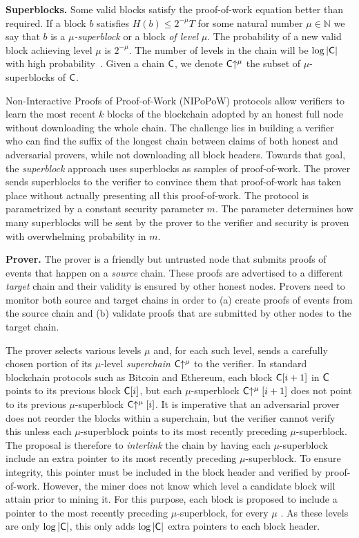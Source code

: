 \noindent
\textbf{Superblocks.}
Some valid blocks satisfy the proof-of-work equation better than required. If
a block $b$ satisfies $H(b) \leq 2^{-\mu} T$ for some natural number
$\mu \in \mathbb{N}$ we say that $b$ is a \emph{$\mu$-superblock} or a block
\emph{of level} $\mu$. The probability of a new valid block achieving level
$\mu$ is $2^{-\mu}$. The number of levels in the chain will be $\log|\mathsf{C}|$
with high probability~\cite{popow}. Given a chain $\mathsf{C}$, we denote
$\mathsf{C}\negthickspace\uparrow^\mu$ the subset of $\mu$-superblocks of $\mathsf{C}$.

Non-Interactive Proofs of Proof-of-Work (NIPoPoW) protocols allow verifiers to
learn the most recent $k$ blocks of the blockchain adopted by an honest full
node without downloading the whole chain. The challenge lies in building a
verifier who can find the suffix of the longest chain between claims of both
honest and adversarial provers, while not downloading all block headers. Towards
that goal, the \emph{superblock} approach uses superblocks as samples of
proof-of-work. The prover sends superblocks to the verifier to convince them
that proof-of-work has taken place without actually presenting all this
proof-of-work. The protocol is parametrized by a constant security parameter
$m$. The parameter determines how many superblocks will be sent by the prover to
the verifier and security is proven with overwhelming probability in $m$.

\noindent \textbf{Prover.} The prover is a friendly but untrusted node that
submits proofs of events that happen on a \emph{source} chain. These proofs are
advertised to a different \emph{target} chain and their validity is ensured by
other honest nodes. Provers need to monitor both source and target chains in
order to (a) create proofs of events from the source chain and (b) validate
proofs that are submitted by other nodes to the target chain.

The prover selects various levels $\mu$ and, for each
such level, sends a carefully chosen portion of its $\mu$-level
\emph{superchain} $\mathsf{C}\negthickspace\uparrow^\mu$ to the verifier. In standard blockchain
protocols such as Bitcoin and Ethereum, each block $\mathsf{C}[i + 1]$ in $\mathsf{C}$
points to its previous block $\mathsf{C}[i]$, but each $\mu$-superblock
$\mathsf{C}\negthickspace\uparrow^\mu[i + 1]$ does not point to its previous $\mu$-superblock
$\mathsf{C}\negthickspace\uparrow^\mu[i]$. It is imperative that an adversarial prover does not
reorder the blocks within a superchain, but the verifier cannot verify this
unless each $\mu$-superblock points to its most recently preceding
$\mu$-superblock. The proposal is therefore to \emph{interlink} the chain by
having each $\mu$-superblock include an extra pointer to its most recently
preceding $\mu$-superblock. To ensure integrity, this pointer must be included
in the block header and verified by proof-of-work. However, the miner does not
know which level a candidate block will attain prior to mining it. For this
purpose, each block is proposed to include a pointer to the most recently
preceding $\mu$-superblock, for every $\mu$
.
As these levels are only $\log|\mathsf{C}|$, this only adds $\log|\mathsf{C}|$ extra
pointers to each block header.

